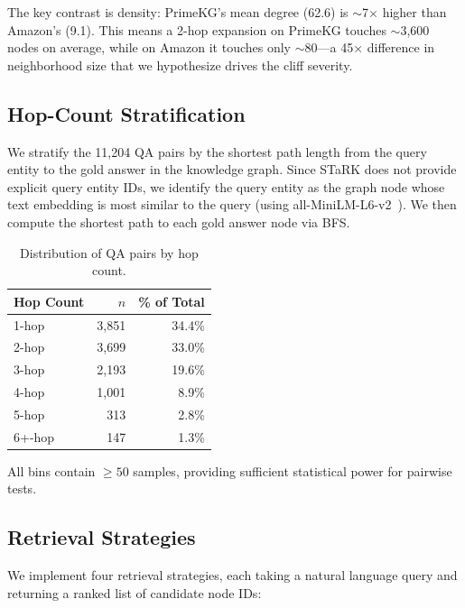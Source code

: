 \documentclass[11pt]{article}
\begin{document}
The key contrast is density: PrimeKG's mean degree (62.6) is $\sim$7$\times$ higher than Amazon's (9.1). This means a 2-hop expansion on PrimeKG touches $\sim$3,600 nodes on average, while on Amazon it touches only $\sim$80---a 45$\times$ difference in neighborhood size that we hypothesize drives the cliff severity.

\subsection{Hop-Count Stratification}

We stratify the 11,204 QA pairs by the shortest path length from the query entity to the gold answer in the knowledge graph. Since STaRK does not provide explicit query entity IDs, we identify the query entity as the graph node whose text embedding is most similar to the query (using all-MiniLM-L6-v2~\citep{reimers2019sentence}). We then compute the shortest path to each gold answer node via BFS.

\begin{table}[h]
\centering
\caption{Distribution of QA pairs by hop count.}
\label{tab:hop_dist}
\begin{tabular}{lrr}
\toprule
Hop Count & $n$ & \% of Total \\
\midrule
1-hop & 3,851 & 34.4\% \\
2-hop & 3,699 & 33.0\% \\
3-hop & 2,193 & 19.6\% \\
4-hop & 1,001 & 8.9\% \\
5-hop & 313 & 2.8\% \\
6+-hop & 147 & 1.3\% \\
\bottomrule
\end{tabular}
\end{table}

All bins contain $\geq 50$ samples, providing sufficient statistical power for pairwise tests.

\subsection{Retrieval Strategies}

We implement four retrieval strategies, each taking a natural language query and returning a ranked list of candidate node IDs:
\end{document}
